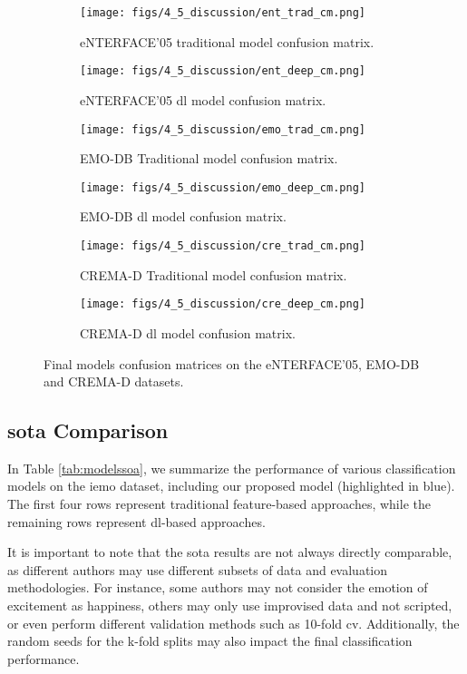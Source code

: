 \begin{figure}
	\begin{subfigure}{.5\textwidth}
		\centering
		\texttt{[image: figs/4\_5\_discussion/ent\_trad\_cm.png]}
		\caption{eNTERFACE'05 traditional model confusion matrix.}
	\end{subfigure}%
	\begin{subfigure}{.5\textwidth}
		\centering
		\texttt{[image: figs/4\_5\_discussion/ent\_deep\_cm.png]}
		\caption{eNTERFACE'05 \ac{dl} model confusion matrix.}
	\end{subfigure}
	\newline
	\begin{subfigure}{.5\textwidth}
		\centering
		\texttt{[image: figs/4\_5\_discussion/emo\_trad\_cm.png]}
		\caption{EMO-DB Traditional model confusion matrix.}
	\end{subfigure}%
	\begin{subfigure}{.5\textwidth}
		\centering
		\texttt{[image: figs/4\_5\_discussion/emo\_deep\_cm.png]}
		\caption{EMO-DB \ac{dl} model confusion matrix.}
	\end{subfigure}
	\newline
	\begin{subfigure}{.5\textwidth}
		\centering
		\texttt{[image: figs/4\_5\_discussion/cre\_trad\_cm.png]}
		\caption{CREMA-D Traditional model confusion matrix.}
	\end{subfigure}%
	\begin{subfigure}{.5\textwidth}
		\centering
		\texttt{[image: figs/4\_5\_discussion/cre\_deep\_cm.png]}
		\caption{CREMA-D \ac{dl} model confusion matrix.}
	\end{subfigure}
	\caption{Final models confusion matrices on the eNTERFACE'05, EMO-DB and CREMA-D datasets.}
	\label{fig:final_cm}
\end{figure}


\subsection{\ac{sota} Comparison}

In Table \ref{tab:modelssoa}, we summarize the performance of various classification models on the \ac{iemo} dataset, including our proposed model (highlighted in blue). The first four rows represent traditional feature-based approaches, while the remaining rows represent \ac{dl}-based approaches.

It is important to note that the \ac{sota} results are not always directly comparable, as different authors may use different subsets of data and evaluation methodologies. For instance, some authors may not consider the emotion of excitement as happiness, others may only use improvised data and not scripted, or even perform different validation methods such as 10-fold \ac{cv}. Additionally, the random seeds for the k-fold splits may also impact the final classification performance.

